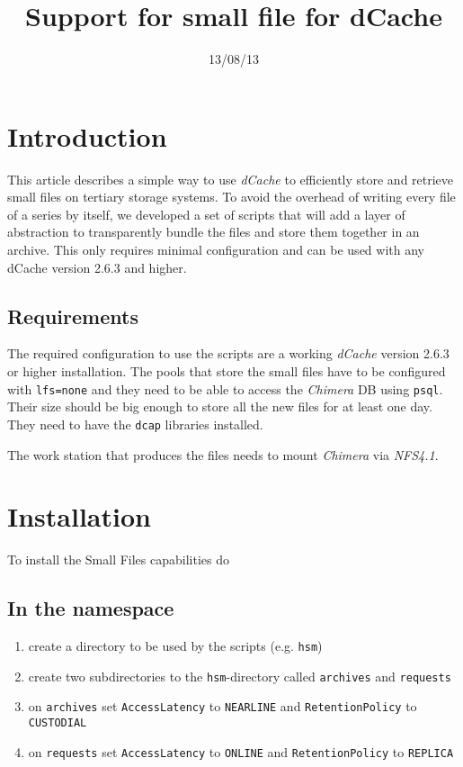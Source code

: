 \documentclass[a4paper,8pt]{scrartcl}
\title{Support for small file for dCache}
\date{13/08/13}
\begin{document}
\titlepage

\section{Introduction}
This article describes a simple way to use \emph{dCache} to efficiently store
and retrieve small files on tertiary storage systems. To avoid the overhead of
writing every file of a series by itself, we developed a set of scripts that
will add a layer of abstraction to transparently bundle the files and store them
together in an archive. This only requires minimal configuration and can be used
with any dCache version 2.6.3 and higher.

\subsection{Requirements}
The required configuration to use the scripts are a working \emph{dCache}
version 2.6.3 or higher installation. The pools that store the small files have
to be configured with \texttt{lfs=none} and they need to be able to access the
\emph{Chimera} DB using \texttt{psql}. Their size should be big enough to store
all the new files for at least one day. They need to have the \texttt{dcap}
libraries installed. 

The work station that produces the files needs to mount \emph{Chimera} via
\emph{NFS4.1}.

\section{Installation}
To install the Small Files capabilities do

\subsection{In the namespace}
\begin{enumerate}
  \item create a directory to be used by the scripts (e.g. \texttt{hsm})
  \item create two subdirectories to the \texttt{hsm}-directory called \texttt{archives} and \texttt{requests}
  \item on \texttt{archives} set \texttt{AccessLatency} to \texttt{NEARLINE} and \texttt{RetentionPolicy} to \texttt{CUSTODIAL}
  \item on \texttt{requests} set \texttt{AccessLatency} to \texttt{ONLINE} and \texttt{RetentionPolicy} to \texttt{REPLICA}
\end{enumerate}
\end{document}
